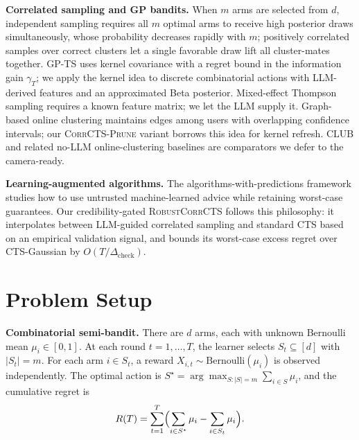\documentclass{article}
\theoremstyle{plain}
\theoremstyle{definition}
\theoremstyle{remark}
\newcommand{\opt}{S^{\star}}
\newcommand{\RobustCorr}{\textsc{RobustCorrCTS}}
\newcommand{\EdgePrune}{\textsc{CorrCTS-Prune}}
\begin{document}
\textbf{Correlated sampling and GP bandits.}
When $m$ arms are selected from $d$, independent sampling requires all $m$ optimal arms to receive high posterior draws simultaneously, whose probability decreases rapidly with $m$; positively correlated samples over correct clusters let a single favorable draw lift all cluster-mates together.
GP-TS \citep{srinivas2010gpucb} uses kernel covariance with a regret bound in the information gain $\gamma_T$; we apply the kernel idea to discrete combinatorial actions with LLM-derived features and an approximated Beta posterior.
Mixed-effect Thompson sampling \citep{kveton2023mixed} requires a known feature matrix; we let the LLM supply it.
Graph-based online clustering \citep{gentile2014online} maintains edges among users with overlapping confidence intervals; our \EdgePrune{} variant borrows this idea for kernel refresh. CLUB and related no-LLM online-clustering baselines are comparators we defer to the camera-ready.

\textbf{Learning-augmented algorithms.}
The algorithms-with-predictions framework \citep{lykouris2018competitive} studies how to use untrusted machine-learned advice while retaining worst-case guarantees.
Our credibility-gated \RobustCorr{} follows this philosophy: it interpolates between LLM-guided correlated sampling and standard CTS based on an empirical validation signal, and  bounds its worst-case excess regret over CTS-Gaussian by $O(T/\Delta_{\text{check}})$.

\section{Problem Setup}\label{sec:setup}

\textbf{Combinatorial semi-bandit.}
There are $d$ arms, each with unknown Bernoulli mean $\mu_i \in [0,1]$.
At each round $t = 1, \ldots, T$, the learner selects $S_t \subseteq [d]$ with $|S_t| = m$.
For each arm $i \in S_t$, a reward $X_{i,t} \sim \text{Bernoulli}(\mu_i)$ is observed independently.
The optimal action is $\opt = \arg\max_{S:|S|=m} \sum_{i \in S} \mu_i$, and the cumulative regret is
\begin{equation}\label{eq:regret}
  R(T) = \sum_{t=1}^{T} \Bigl(\sum_{i \in \opt} \mu_i - \sum_{i \in S_t} \mu_i\Bigr).
\end{equation}
\end{document}
